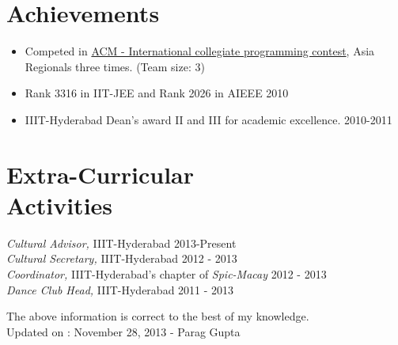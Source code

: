 \documentclass[margin]{res}
\begin{document}
\begin{resume}
\begin{table}[htbp]
\begin{tabular}[ht]{|l | p{7cm} |}
\end{tabular}
\end{table}

\section{Achievements}

\begin{itemize}
\item
	\hypersetup{urlcolor=black}	
	Competed in \href{http://icpc.baylor.edu/}{ACM - International collegiate programming contest}, Asia Regionals three times.
	\hypersetup{urlcolor=blue}
	{(Team size: 3)}

\item Rank 3316 in IIT-JEE and Rank 2026 in AIEEE \hfill{2010}
\item IIIT-Hyderabad Dean's award II and III for academic excellence. \hfill{2010-2011} 
\end{itemize}


\section{Extra-Curricular \\ Activities}
{\it Cultural Advisor,} IIIT-Hyderabad \hfill{2013-Present} \\
{\it Cultural Secretary,} IIIT-Hyderabad  \hfill{2012 - 2013} \\
{\it Coordinator,} IIIT-Hyderabad's chapter of {\it Spic-Macay} \hfill{2012 - 2013} \\
{\it Dance Club Head,} IIIT-Hyderabad \hfill{2011 - 2013}
            
\noindent The above information is correct to the best of my knowledge.\\
Updated on : November 28, 2013 \hfill{- Parag Gupta} 


\end{resume}
\end{document}
